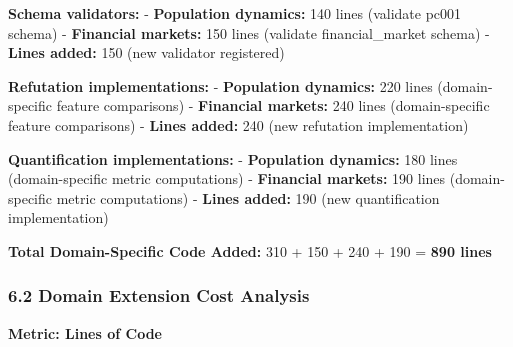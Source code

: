 \documentclass[
]{article}
\begin{document}
\textbf{Schema validators:} - \textbf{Population dynamics:} 140 lines
(validate pc001 schema) - \textbf{Financial markets:} 150 lines
(validate financial\_market schema) - \textbf{Lines added:} 150 (new
validator registered)

\textbf{Refutation implementations:} - \textbf{Population dynamics:} 220
lines (domain-specific feature comparisons) - \textbf{Financial
markets:} 240 lines (domain-specific feature comparisons) -
\textbf{Lines added:} 240 (new refutation implementation)

\textbf{Quantification implementations:} - \textbf{Population dynamics:}
180 lines (domain-specific metric computations) - \textbf{Financial
markets:} 190 lines (domain-specific metric computations) -
\textbf{Lines added:} 190 (new quantification implementation)

\textbf{Total Domain-Specific Code Added:} 310 + 150 + 240 + 190 =
\textbf{890 lines}

\subsubsection{6.2 Domain Extension Cost
Analysis}\label{domain-extension-cost-analysis}

\textbf{Metric: Lines of Code}
\end{document}
